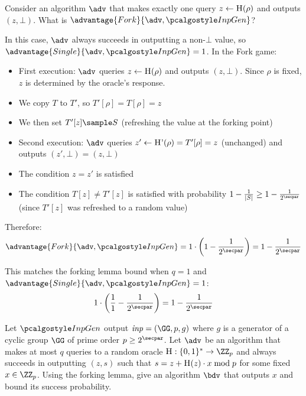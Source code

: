 \begin{exercise}
  Consider an algorithm $\adv$ that makes exactly one query $z \gets {\normalfont\textsc{H}}(\rho)$ and outputs $(z, \bot)$. What is $\advantage{Fork}{\adv, \algo{InpGen}}$?
\end{exercise}

\ifsolutions
\begin{mysolution}
  In this case, $\adv$ always succeeds in outputting a non-$\bot$ value, so $\advantage{Single}{\adv, \algo{InpGen}} = 1$. In the Fork game:
  
  \begin{itemize}
    \item First execution: $\adv$ queries $z \gets {\normalfont\textsc{H}}(\rho)$ and outputs $(z, \bot)$. Since $\rho$ is fixed, $z$ is determined by the oracle's response.
    \item We copy $T$ to $T'$, so $T'[\rho] = T[\rho] = z$
    \item We then set $T'[z] \sample S$ (refreshing the value at the forking point)
    \item Second execution: $\adv$ queries $z' \gets {\normalfont\textsc{H'}}(\rho) = T'[\rho] = z$ (unchanged) and outputs $(z', \bot) = (z, \bot)$
    \item The condition $z = z'$ is satisfied
    \item The condition $T[z] \neq T'[z]$ is satisfied with probability $1 - \frac{1}{|S|} \geq 1 - \frac{1}{2^\secpar}$ (since $T'[z]$ was refreshed to a random value)
  \end{itemize}
  
  Therefore:
  \[
  \advantage{Fork}{\adv, \algo{InpGen}} = 1 \cdot \left(1 - \frac{1}{2^\secpar}\right) = 1 - \frac{1}{2^\secpar}
  \]
  
  This matches the forking lemma bound when $q = 1$ and $\advantage{Single}{\adv, \algo{InpGen}} = 1$:
  \[
  1 \cdot \left(\frac{1}{1} - \frac{1}{2^\secpar}\right) = 1 - \frac{1}{2^\secpar}
  \]
\end{mysolution}
\fi


\begin{exercise}
  Let $\algo{InpGen}$ output $\mathit{inp} = (\GG,p,g)$ where $g$ is a generator of a cyclic group $\GG$ of prime order $p \geq 2^\secpar$.
  Let $\adv$ be an algorithm that makes at most $q$ queries to a random oracle $\pcoracle{H}: \{0,1\}^* \rightarrow \ZZ_p$ and always succeeds in outputting $(z, s)$ such that $s = z + {\normalfont\textsc{H}}(z) \cdot x \bmod p$ for some fixed $x \in \ZZ_p$.
  Using the forking lemma, give an algorithm $\bdv$ that outputs $x$ and bound its success probability.
\end{exercise}

